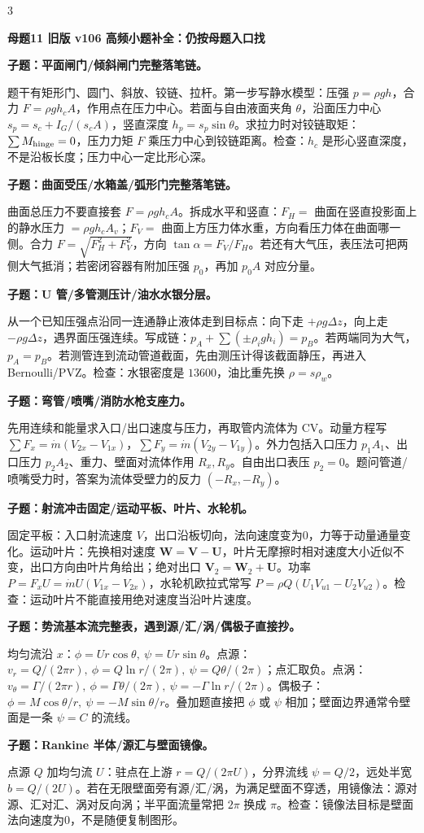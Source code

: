 \documentclass[a4paper]{article}
\newcommand{\mt}[1]{\vspace{0.45pt}\colorbox{M}{\parbox{\dimexpr\linewidth-2\fboxsep}{\color{white}\bfseries #1}}\par}
\newcommand{\qt}[1]{\vspace{0.25pt}\colorbox{Q}{\parbox{\dimexpr\linewidth-2\fboxsep}{\color{white}\bfseries #1}}\par}
\newcommand{\ans}[1]{\colorbox{G}{\parbox{\dimexpr\linewidth-2\fboxsep}{#1}}\par}
\begin{document}
\begin{multicols}{3}
\mt{母题11 旧版 v106 高频小题补全：仍按母题入口找}
\qt{子题：平面闸门/倾斜闸门完整落笔链。}
\ans{题干有矩形门、圆门、斜放、铰链、拉杆。第一步写静水模型：压强 $p=\rho gh$，合力 $F=\rho gh_cA$，作用点在压力中心。若面与自由液面夹角 $\theta$，沿面压力中心 $s_p=s_c+I_G/(s_cA)$，竖直深度 $h_p=s_p\sin\theta$。求拉力时对铰链取矩：$\sum M_{\rm hinge}=0$，压力力矩 $F$ 乘压力中心到铰链距离。检查：$h_c$ 是形心竖直深度，不是沿板长度；压力中心一定比形心深。}
\qt{子题：曲面受压/水箱盖/弧形门完整落笔链。}
\ans{曲面总压力不要直接套 $F=\rho gh_cA$。拆成水平和竖直：$F_H=$ 曲面在竖直投影面上的静水压力 $=\rho gh_cA_v$；$F_V=$ 曲面上方压力体水重，方向看压力体在曲面哪一侧。合力 $F=\sqrt{F_H^2+F_V^2}$，方向 $\tan\alpha=F_V/F_H$。若还有大气压，表压法可把两侧大气抵消；若密闭容器有附加压强 $p_0$，再加 $p_0A$ 对应分量。}
\qt{子题：U 管/多管测压计/油水水银分层。}
\ans{从一个已知压强点沿同一连通静止液体走到目标点：向下走 $+\rho g\Delta z$，向上走 $-\rho g\Delta z$，遇界面压强连续。写成链：$p_A+\sum(\pm\rho_i g h_i)=p_B$。若两端同为大气，$p_A=p_B$。若测管连到流动管道截面，先由测压计得该截面静压，再进入 Bernoulli/PVZ。检查：水银密度是 $13600$，油比重先换 $\rho=s\rho_w$。}
\qt{子题：弯管/喷嘴/消防水枪支座力。}
\ans{先用连续和能量求入口/出口速度与压力，再取管内流体为 CV。动量方程写 $\sum F_x=\dot m(V_{2x}-V_{1x})$，$\sum F_y=\dot m(V_{2y}-V_{1y})$。外力包括入口压力 $p_1A_1$、出口压力 $p_2A_2$、重力、壁面对流体作用 $R_x,R_y$。自由出口表压 $p_2=0$。题问管道/喷嘴受力时，答案为流体受壁力的反力 $(-R_x,-R_y)$。}
\qt{子题：射流冲击固定/运动平板、叶片、水轮机。}
\ans{固定平板：入口射流速度 $V$，出口沿板切向，法向速度变为0，力等于动量通量变化。运动叶片：先换相对速度 $\bm W=\bm V-\bm U$，叶片无摩擦时相对速度大小近似不变，出口方向由叶片角给出；绝对出口 $\bm V_2=\bm W_2+\bm U$。功率 $P=F_xU=\dot m U(V_{1x}-V_{2x})$，水轮机欧拉式常写 $P=\rho Q(U_1V_{u1}-U_2V_{u2})$。检查：运动叶片不能直接用绝对速度当沿叶片速度。}
\qt{子题：势流基本流完整表，遇到源/汇/涡/偶极子直接抄。}
\ans{均匀流沿 $x$：$\phi=Ur\cos\theta,\ \psi=Ur\sin\theta$。点源：$v_r=Q/(2\pi r),\ \phi=Q\ln r/(2\pi),\ \psi=Q\theta/(2\pi)$；点汇取负。点涡：$v_\theta=\Gamma/(2\pi r),\ \phi=\Gamma\theta/(2\pi),\ \psi=-\Gamma\ln r/(2\pi)$。偶极子：$\phi=M\cos\theta/r,\ \psi=-M\sin\theta/r$。叠加题直接把 $\phi$ 或 $\psi$ 相加；壁面边界通常令壁面是一条 $\psi=C$ 的流线。}
\qt{子题：Rankine 半体/源汇与壁面镜像。}
\ans{点源 $Q$ 加均匀流 $U$：驻点在上游 $r=Q/(2\pi U)$，分界流线 $\psi=Q/2$，远处半宽 $b=Q/(2U)$。若在无限壁面旁有源/汇/涡，为满足壁面不穿透，用镜像法：源对源、汇对汇、涡对反向涡；半平面流量常把 $2\pi$ 换成 $\pi$。检查：镜像法目标是壁面法向速度为0，不是随便复制图形。}

\end{multicols}
\end{document}

